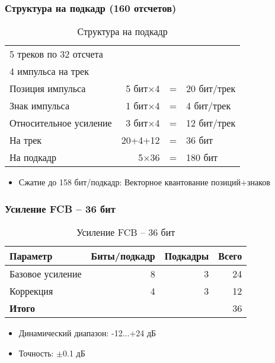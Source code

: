 \documentclass{report}
\begin{document}
	\subsubsection{Структура на подкадр (160 отсчетов)}
	\begin{table}[H]
		\centering
		\caption{Структура на подкадр}
		\begin{tabular}{lrcl}
			\toprule
				5 треков по 32 отсчета & & & \\
				4 импульса на трек & & & \\
				Позиция импульса & 5 бит$\times$4 & = & 20 бит/трек \\
				Знак импульса & 1 бит$\times$4 & = & 4 бит/трек \\
				Относительное усиление & 3 бит$\times$4 & = & 12 бит/трек \\
				На трек & 20+4+12 & = & 36 бит \\
				На подкадр & 5$\times$36 & = & 180 бит \\
			\bottomrule
		\end{tabular}
	\end{table}

	\begin{itemize}
		\item Сжатие до 158 бит/подкадр: Векторное квантование позиций+знаков
	\end{itemize}
	
	\subsubsection{Усиление FCB -- 36 бит}
	\begin{table}[H]
		\centering
		\caption{Усиление FCB -- 36 бит}
		\begin{tabular}{lrrr}
			\toprule
			\textbf{Параметр} & \textbf{Биты/подкадр} & \textbf{Подкадры} & \textbf{Всего} \\
			\midrule
			Базовое усиление & 8 & 3 & 24 \\
			Коррекция & 4 & 3 & 12 \\
			\bottomrule
			\textbf{Итого} & & & 36 \\
			\bottomrule
		\end{tabular}
	\end{table}
	
	\begin{itemize}
		\item Динамический диапазон: -12$\ldots$+24 дБ
		\item Точность: $\pm$0.1 дБ
	\end{itemize}
\end{document}
